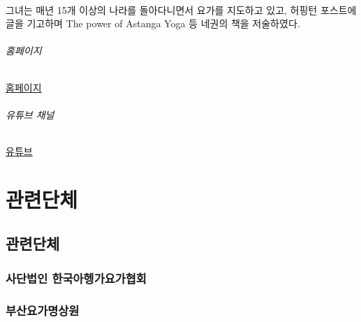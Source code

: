 \documentclass[12pt, a4paper, oneside]{book}
\let\stdsection\section
\renewcommand\section{\newpage\stdsection}
\begin{document}
\paragraph{}
그녀는 매년 15개 이상의 나라를 돌아다니면서 요가를 지도하고 있고, 허핑턴 포스트에 글을 기고하며 The power of Astanga Yoga 등 네권의 책을 저술하였다.



\paragraph{홈페이지}
	\href{http://www.kinoyoga.com}{홈페이지}



\paragraph{유튜브 채널}
	\href{http://www.youtube.com/kinoyoga}{유튜브}






	\part{관련단체}
	\noptcrule
	\parttoc				



	\chapter{관련단체}
	\minitoc

%
%
%
	\newpage
	\section{사단법인 한국아헹가요가협회 }



%
%
%
	\newpage
	\section{부산요가명상원}
\end{document}
